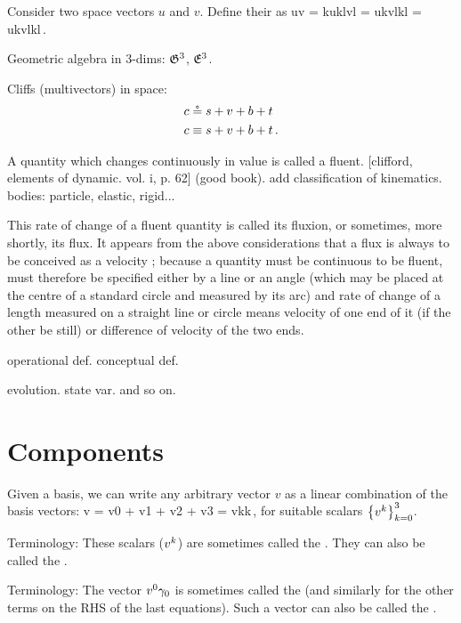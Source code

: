 Consider two space vectors $u$ and $v$. Define their  as
%
\beq
  u\iprod v = \ifvec k\ivec uk\iprod\ifvec l\ivec vl
            = \ivec uk\ivec vl\ifvec k\iprod\ifvec l
            = \ivec uk\ivec vl\ifmet kl\,.
\eeq

Geometric algebra in 3-dims: $\mathfrak{G}^3$, $\mathfrak{E}^{3}$.

Cliffs (multivectors) in space:
%
\begin{align*}
  c &\circeq s + v + b + t \\
  c &\equiv s + v + b + t \,.
\end{align*}

A quantity which changes continuously in value is called a fluent. [clifford, elements of dynamic. vol. i, p. 62] (good book). add classification of kinematics. bodies: particle, elastic, rigid...

This rate of change of a fluent quantity is called its fluxion, or sometimes, more shortly, its flux. It appears from the above considerations that a flux is always to be conceived as a velocity ; because a quantity must be continuous to be fluent, must therefore be specified either by a line or an angle (which may be placed at the centre of a standard circle and measured by its arc) and rate of change of a length measured on a straight line or circle means velocity of one end of it (if the other be still) or difference of velocity of the two ends.

operational def. conceptual def.

evolution. state var. and so on.


\section{Components}
%
Given a basis, we can write any arbitrary vector $v$ as a linear combination of the basis vectors:
%
\beq
  v = \ivec v0 + \ivec v1 + \ivec v2 + \ivec v3
    = \ivec vk\ifvec k\,,
\eeq
%
for suitable scalars $\left\lbrace{{v}^{k}}\right\rbrace_{k = 0}^{3}$.

Terminology: These scalars (${v}^{k}$) are sometimes called the . They can also be called the .

Terminology: The vector ${v}^{0}\gamma_{0}$ is sometimes called the  (and similarly for the other terms on the RHS of the last equations). Such a vector can also be called the .

